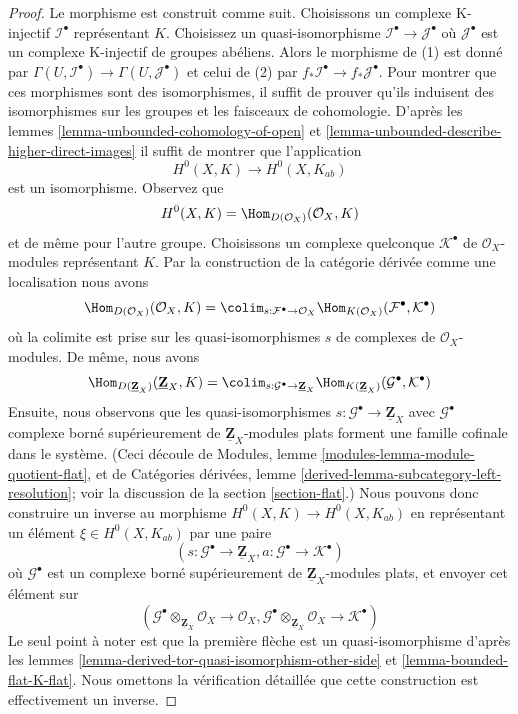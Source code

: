 {\begin{lemma}
\end{lemma}

\begin{proof}

Le morphisme est construit comme suit. Choisissons un complexe K-injectif
$\mathcal{I}^\bullet$ représentant $K$. Choisissez un quasi-isomorphisme
$\mathcal{I}^\bullet \to \mathcal{J}^\bullet$ où $\mathcal{J}^\bullet$
est un complexe K-injectif de groupes abéliens. Alors le morphisme de (1) est donné par $\Gamma(U, \mathcal{I}^\bullet) \to \Gamma(U, \mathcal{J}^\bullet)$
et celui de (2) par
$f_*\mathcal{I}^\bullet \to f_*\mathcal{J}^\bullet$. Pour montrer que ces morphismes sont des isomorphismes, il suffit de prouver qu'ils induisent des isomorphismes sur les groupes et les faisceaux de cohomologie. D'après les lemmes \ref{lemma-unbounded-cohomology-of-open} et
\ref{lemma-unbounded-describe-higher-direct-images}
il suffit de montrer que l'application
$$
H^0(X, K) \longrightarrow H^0(X, K_{ab})
$$
est un isomorphisme. Observez que
$$
H^0(X, K) = \Hom_{D(\mathcal{O}_X)}(\mathcal{O}_X, K)
$$
et de même pour l'autre groupe. Choisissons un complexe quelconque $\mathcal{K}^\bullet$
de $\mathcal{O}_X$-modules représentant $K$. Par la construction de la catégorie dérivée comme une localisation nous avons
$$
\Hom_{D(\mathcal{O}_X)}(\mathcal{O}_X, K) =
\colim_{s : \mathcal{F}^\bullet \to \mathcal{O}_X}
\Hom_{K(\mathcal{O}_X)}(\mathcal{F}^\bullet, \mathcal{K}^\bullet)
$$
où la colimite est prise sur les quasi-isomorphismes $s$ de complexes de
$\mathcal{O}_X$-modules. De même, nous avons
$$
\Hom_{D(\underline{\mathbf{Z}}_X)}(\underline{\mathbf{Z}}_X, K) =
\colim_{s : \mathcal{G}^\bullet \to \underline{\mathbf{Z}}_X}
\Hom_{K(\underline{\mathbf{Z}}_X)}(\mathcal{G}^\bullet, \mathcal{K}^\bullet)
$$
Ensuite, nous observons que les quasi-isomorphismes
$s : \mathcal{G}^\bullet \to \underline{\mathbf{Z}}_X$
avec $\mathcal{G}^\bullet$ complexe borné supérieurement de
$\underline{\mathbf{Z}}_X$-modules plats forment une famille cofinale dans le système. (Ceci découle de Modules, lemme \ref{modules-lemma-module-quotient-flat}, et de Catégories dérivées, lemme \ref{derived-lemma-subcategory-left-resolution}; voir la discussion de la section \ref{section-flat}.) Nous pouvons donc construire un inverse au morphisme
$H^0(X, K) \longrightarrow H^0(X, K_{ab})$
en représentant un élément $\xi \in H^0(X, K_{ab})$ par une paire
$$
(s : \mathcal{G}^\bullet \to \underline{\mathbf{Z}}_X,
a : \mathcal{G}^\bullet \to \mathcal{K}^\bullet)
$$
où $\mathcal{G}^\bullet$ est un complexe borné supérieurement de
$\underline{\mathbf{Z}}_X$-modules plats, et envoyer cet élément sur
$$
(\mathcal{G}^\bullet \otimes_{\underline{\mathbf{Z}}_X} \mathcal{O}_X
\to \mathcal{O}_X,
\mathcal{G}^\bullet  \otimes_{\underline{\mathbf{Z}}_X} \mathcal{O}_X
\to \mathcal{K}^\bullet)
$$
Le seul point à noter est que la première flèche est un quasi-isomorphisme d'après les lemmes \ref{lemma-derived-tor-quasi-isomorphism-other-side} et
\ref{lemma-bounded-flat-K-flat}. Nous omettons la vérification détaillée que cette construction est effectivement un inverse.


\end{proof}}
